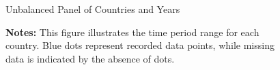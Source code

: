 \documentclass[12pt]{article}
\begin{document}
\newpage
\printbibliography

\newpage


\newpage
\begin{figure}[H]
    \centering
    \scalebox{0.7}{}
    \caption{Unbalanced Panel of Countries and Years}
    \label{fig:panel}
    \captionsetup{font=footnotesize}
    \caption*{\textbf{Notes:} This figure illustrates the time period range for each country. Blue dots represent recorded data points, while missing data is indicated by the absence of dots.}
\end{figure}

\newpage


\newpage


\newpage


%
\end{document}
